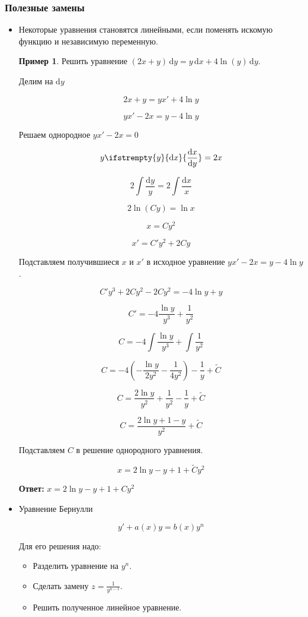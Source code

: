 \documentclass[a4paper, 14pt]{article}
\newcommand{\dx}{\mathrm{d}x}
\newcommand{\dy}{\mathrm{d}y}
\newcommand{\dv}[2]{%
  \ifstrempty{#2}%
    {\mathrm{d}#1}%
    {\frac{\mathrm{d}#1}{\mathrm{d}#2}}%
}
\theoremstyle{definition}
\newtheorem*{example}{Пример}
\newenvironment{answer}
  {\par\noindent\textbf{Ответ:}}
  {\par}
\begin{document}
\subsubsection{Полезные замены}
\begin{itemize}
\item \textbf{}Некоторые уравнения становятся линейными, если поменять искомую функцию и независимую переменную.
\begin{example}
    Решить уравнение $(2x+y)\,\dy = y\,\dx+4\ln{(y)}\,\dy$.

    Делим на $\dy$

    \[2x+y = yx'+4\ln {y}\]

    \[yx' - 2x = y - 4\ln{y}\]

    Решаем однородное $yx' - 2x = 0$

    \[y\dv{x}{y} = 2x\]

    \[2\int{\frac{\dy}{y}} = 2\int{\frac{\dx}{x}}\]

    \[2\ln{(Cy)} = \ln{x}\]

    \[x=Cy^2\]

    \[x'=C'y^2+2Cy\]

    Подставляем получившиеся $x$ и $x'$ в исходное уравнение $yx' - 2x = y - 4\ln{y}$.

    \[C'y^3+2Cy^2 - 2Cy^2 = -4\ln{y} +y\]

    \[C'= -4\frac{\ln{y}}{y^3}+\frac{1}{y^2}\]

    \[C= -4\int{\frac{\ln{y}}{y^3}}+\int{\frac{1}{y^2}}\]

    \[C = -4(-\frac{\ln{y}}{2y^2}-\frac{1}{4y^2})-\frac{1}{y} +\tilde{C}\]

    \[C = \frac{2\ln{y}}{y^2}+\frac{1}{y^2}-\frac{1}{y} +\tilde{C}\]

    \[C = \frac{2\ln{y}+1-y}{y^2}+\tilde{C}\]

    Подставляем $C$ в решение однородного уравнения.

    \[x=2\ln{y} - y +1 + \tilde{C}y^2\]
    
\end{example}
\begin{answer}
    $x=2\ln{y} - y +1 + Cy^2$
\end{answer}


\item \textbf{}Уравнение Бернулли

\[y'+a(x)y = b(x)y^n\]

Для его решения надо:

\begin{itemize}
\item[\scriptsize\textbullet] Разделить уравнение на $y^n$.
\item[\scriptsize\textbullet] Сделать замену $z=\frac{1}{y^{n-1}}$.
\item[\scriptsize\textbullet] Решить полученное линейное уравнение.
\end{itemize}


\end{itemize}
\end{document}
